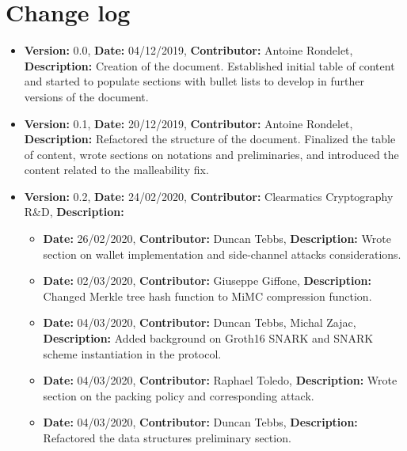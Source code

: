 
\chapter*{Change log}\label{chap:change-log}
\begin{itemize}
    \item \textbf{Version:} 0.0, \textbf{Date:} 04/12/2019, \textbf{Contributor:} Antoine Rondelet, \textbf{Description:} Creation of the document. Established initial table of content and started to populate sections with bullet lists to develop in further versions of the document.
    \item \textbf{Version:} 0.1, \textbf{Date:} 20/12/2019, \textbf{Contributor:} Antoine Rondelet, \textbf{Description:} Refactored the structure of the document. Finalized the table of content, wrote sections on notations and preliminaries, and introduced the content related to the malleability fix.
    \item \textbf{Version:} 0.2, \textbf{Date:} 24/02/2020, \textbf{Contributor:} Clearmatics Cryptography R\&D, \textbf{Description:}
        \begin{itemize}
            \item \textbf{Date:} 26/02/2020, \textbf{Contributor:} Duncan Tebbs, \textbf{Description:} Wrote section on wallet implementation and side-channel attacks considerations.
            \item \textbf{Date:} 02/03/2020, \textbf{Contributor:} Giuseppe Giffone, \textbf{Description:} Changed Merkle tree hash function to MiMC compression function.
            \item \textbf{Date:} 04/03/2020, \textbf{Contributor:} Duncan Tebbs, Michal Zajac, \textbf{Description:} Added background on Groth16 SNARK and SNARK scheme instantiation in the protocol.
            \item \textbf{Date:} 04/03/2020, \textbf{Contributor:} Raphael Toledo, \textbf{Description:} Wrote section on the packing policy and corresponding attack.
            \item \textbf{Date:} 04/03/2020, \textbf{Contributor:} Duncan Tebbs, \textbf{Description:} Refactored the data structures preliminary section.

\end{itemize}
\end{itemize}
